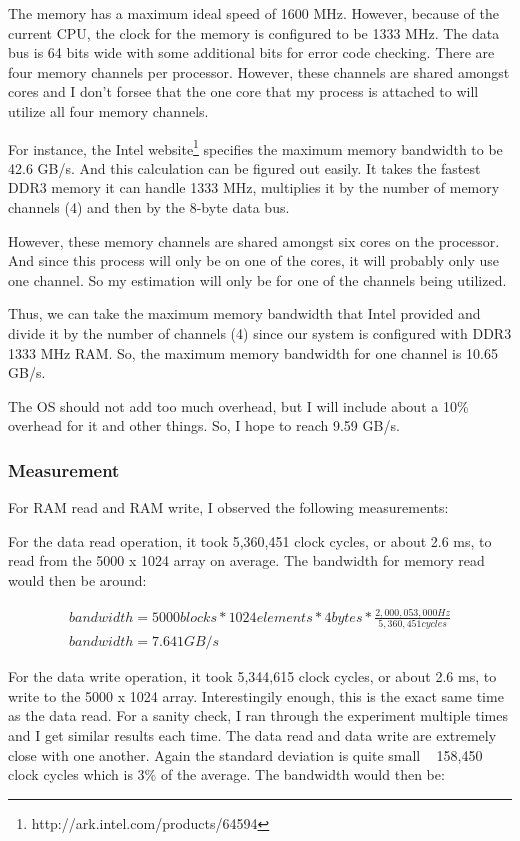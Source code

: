 \documentclass[paper=a4, fontsize=11pt]{scrartcl}
\numberwithin{equation}{section}        %
\numberwithin{figure}{section}          %
\numberwithin{table}{section}               %
\begin{document}
The memory has a maximum ideal speed of 1600 MHz.  However, because of the current CPU, the clock for the memory is configured to be 1333 MHz. The data bus is 64 bits wide with some additional bits for error code checking.  There are four memory channels per processor.  However, these channels are shared amongst cores and I don't forsee that the one core that my process is attached to will utilize all four memory channels.

For instance, the Intel website\footnote{http://ark.intel.com/products/64594} specifies the maximum memory bandwidth to be 42.6 GB/s.  And this calculation can be figured out easily.  It takes the fastest DDR3 memory it can handle 1333 MHz, multiplies it by the number of memory channels (4) and then by the 8-byte data bus.

However, these memory channels are shared amongst six cores on the processor.  And since this process will only be on one of the cores, it will probably only use one channel.  So my estimation will only be for one of the channels being utilized.

Thus, we can take the maximum memory bandwidth that Intel provided and divide it by the number of channels (4) since our system is configured with DDR3 1333 MHz RAM.  So, the maximum memory bandwidth for one channel is 10.65 GB/s.

The OS should not add too much overhead, but I will include about a 10\% overhead for it and other things.  So, I hope to reach 9.59 GB/s.

\subsubsection{Measurement}

For RAM read and RAM write, I observed the following measurements:

For the data read operation, it took 5,360,451 clock cycles, or about 2.6 ms, to read from the 5000 x 1024 array on average.  The bandwidth for memory read would then be around:

\begin{gather}
bandwidth = 5000 blocks * 1024 elements * 4 bytes * \frac{2,000,053,000 Hz}{5,360,451 cycles} \\
bandwidth = 7.641 GB/s
\end{gather}

For the data write operation, it took 5,344,615 clock cycles, or about 2.6 ms, to write to the 5000 x 1024 array.  Interestingily enough, this is the exact same time as the data read.  For a sanity check, I ran through the experiment multiple times and I get similar results each time.  The data read and data write are extremely close with one another.  Again the standard deviation is quite small ~ 158,450 clock cycles which is 3\% of the average.  The bandwidth would then be:
\end{document}
